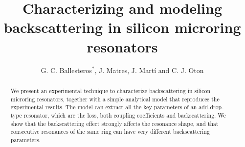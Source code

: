 \documentclass[10pt,letterpaper]{article}
\begin{document}
\title{Characterizing and modeling backscattering in silicon microring resonators}

\author{G. C. Ballesteros$^*$, J. Matres, J. Mart\'i and C. J. Oton}

\address{Nanophotonics Technology Center, \\ Universidad Polit\'ecnica de Valencia, Camino de Vera s/n, 46022, Valencia, Spain}




\begin{abstract}
We present an experimental technique to characterize backscattering in silicon microring resonators, together with a simple analytical model that reproduces the experimental results. The model can extract all the key parameters of an add-drop-type resonator, which are the loss, both coupling coefficients and backscattering. We show that the backscattering effect strongly affects the resonance shape, and that consecutive resonances of the same ring can have very different backscattering parameters.
\end{abstract}

\end{document}
